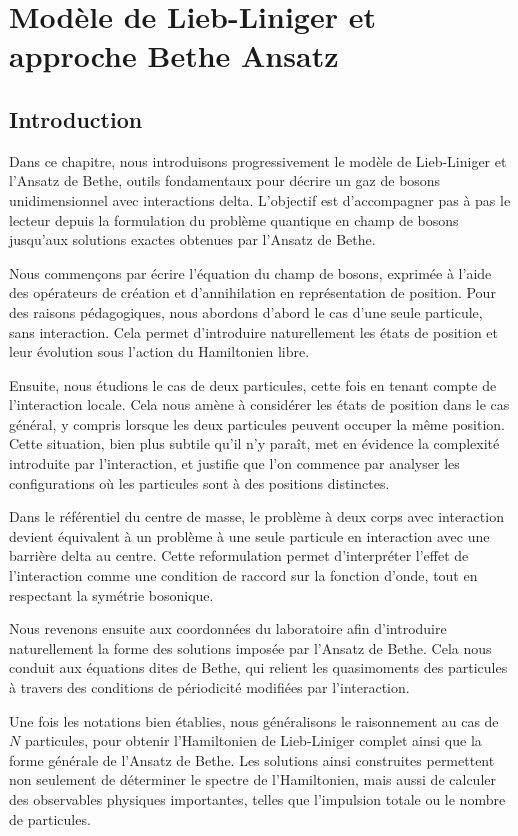 \chapter{Modèle de Lieb-Liniger et approche Bethe Ansatz}\label{chap:LL-BA}
\minitoc
\minitoc

\section*{Introduction}

Dans ce chapitre, nous introduisons progressivement le modèle de Lieb-Liniger et l'Ansatz de Bethe, outils fondamentaux pour décrire un gaz de bosons unidimensionnel avec interactions delta. L'objectif est d'accompagner pas à pas le lecteur depuis la formulation du problème quantique en champ de bosons jusqu'aux solutions exactes obtenues par l'Ansatz de Bethe.

Nous commençons par écrire l'équation du champ de bosons, exprimée à l’aide des opérateurs de création et d’annihilation en représentation de position. Pour des raisons pédagogiques, nous abordons d’abord le cas d’une seule particule, sans interaction. Cela permet d’introduire naturellement les états de position et leur évolution sous l’action du Hamiltonien libre.

Ensuite, nous étudions le cas de deux particules, cette fois en tenant compte de l’interaction locale. Cela nous amène à considérer les états de position dans le cas général, y compris lorsque les deux particules peuvent occuper la même position. Cette situation, bien plus subtile qu’il n’y paraît, met en évidence la complexité introduite par l’interaction, et justifie que l’on commence par analyser les configurations où les particules sont à des positions distinctes.

Dans le référentiel du centre de masse, le problème à deux corps avec interaction devient équivalent à un problème à une seule particule en interaction avec une barrière delta au centre. Cette reformulation permet d’interpréter l’effet de l’interaction comme une condition de raccord sur la fonction d’onde, tout en respectant la symétrie bosonique.

Nous revenons ensuite aux coordonnées du laboratoire afin d’introduire naturellement la forme des solutions imposée par l’Ansatz de Bethe. Cela nous conduit aux équations dites de Bethe, qui relient les quasimoments des particules à travers des conditions de périodicité modifiées par l’interaction.

Une fois les notations bien établies, nous généralisons le raisonnement au cas de \(N\) particules, pour obtenir l’Hamiltonien de Lieb-Liniger complet ainsi que la forme générale de l’Ansatz de Bethe. Les solutions ainsi construites permettent non seulement de déterminer le spectre de l’Hamiltonien, mais aussi de calculer des observables physiques importantes, telles que l’impulsion totale ou le nombre de particules.

